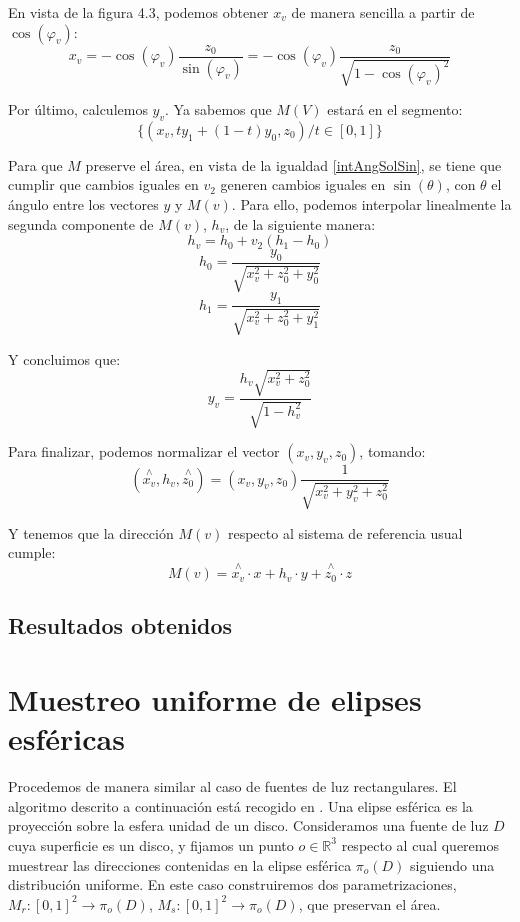 En vista de la figura 4.3, podemos obtener $x_v$ de manera sencilla a partir de $\cos(\varphi_v)$:
$$x_v = -\cos(\varphi_v)\frac{z_0}{\sin(\varphi_v)} = -\cos(\varphi_v)\frac{z_0}{\sqrt{1-\cos(\varphi_v)^2}} $$

Por último, calculemos $y_v$. Ya sabemos que $M(V)$ estará en el segmento:
$$\{(x_v, t y_1 + (1-t) y_0, z_0) / t\in [0,1]\}$$

Para que $M$ preserve el área, en vista de la igualdad \ref{intAngSolSin}, se tiene que cumplir que cambios iguales en $v_2$ generen cambios iguales en $\sin(\theta)$, con $\theta$ el ángulo entre los vectores $y$ y $M(v)$. Para ello, podemos interpolar linealmente la segunda componente de $M(v)$, $h_v$, de la siguiente manera:
$$h_v = h_0 + v_2(h_1-h_0) $$
$$h_0=\frac{y_0}{\sqrt{x_v^2+z_0^2+y_0^2}} $$
$$h_1=\frac{y_1}{\sqrt{x_v^2+z_0^2+y_1^2}}$$

Y concluimos que:
$$y_v = \frac{h_v \sqrt{x_v^2+z_0^2}}{\sqrt{1-h_v^2}}$$

Para finalizar, podemos normalizar el vector $(x_v, y_v, z_0)$, tomando:
$$(\overset{\wedge}{x_v}, h_v, \overset{\wedge}{z_0}) = (x_v, y_v, z_0)\frac{1}{\sqrt{x_v^2 + y_v^2 + z_0^2}}$$

Y tenemos que la dirección $M(v)$ respecto al sistema de referencia usual cumple:
$$M(v) = \overset{\wedge}{x_v} \cdot x + h_v\cdot y + \overset{\wedge}{z_0}\cdot z $$

\subsection{Resultados obtenidos}

\section{Muestreo uniforme de elipses esféricas}

Procedemos de manera similar al caso de fuentes de luz rectangulares. El algoritmo descrito a continuación está recogido en \cite{Guillen2017}. Una elipse esférica es la proyección sobre la esfera unidad de un disco. Consideramos una fuente de luz $D$ cuya superficie es un disco, y fijamos un punto $o\in\mathds{R}^3$ respecto al cual queremos muestrear las direcciones contenidas en la elipse esférica $\pi_o(D)$ siguiendo una distribución uniforme. En este caso construiremos dos parametrizaciones, $M_r:[0,1]^2\rightarrow \pi_o(D)$, $M_s:[0,1]^2\rightarrow \pi_o(D)$, que preservan el área.

